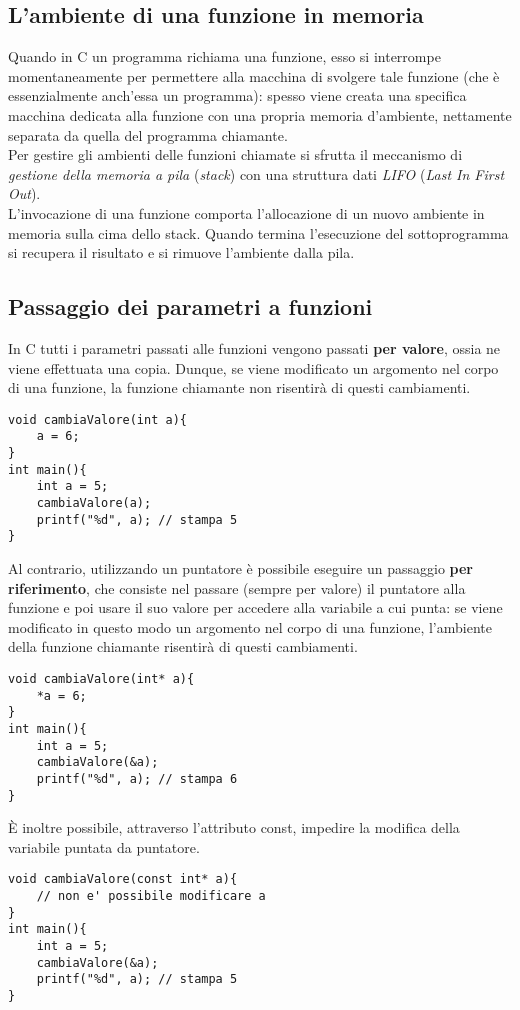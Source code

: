 \subsection{L'ambiente di una funzione in memoria}
Quando in C un programma richiama una funzione, esso si interrompe momentaneamente per permettere alla macchina di svolgere tale funzione (che è essenzialmente anch’essa un programma): spesso viene creata una specifica macchina dedicata alla funzione con una propria memoria d'ambiente, nettamente separata da quella del programma chiamante.\\
Per gestire gli ambienti delle funzioni chiamate si sfrutta il meccanismo di \textit{gestione della memoria a pila} (\textit{stack}) con una struttura dati \textit{LIFO} (\textit{Last In First Out}).\\ L’invocazione di una funzione comporta l’allocazione di un nuovo ambiente in memoria sulla cima dello stack. Quando termina l’esecuzione del sottoprogramma si recupera il risultato e si rimuove l'ambiente dalla pila.

\subsection{Passaggio dei parametri a funzioni}
In C tutti i parametri passati alle funzioni vengono passati \textbf{per valore}, ossia ne viene effettuata una copia. Dunque, se viene modificato un argomento nel corpo di una funzione, la funzione chiamante non risentirà di questi cambiamenti.
\begin{lstlisting}[title={Il passaggio per valore}]
void cambiaValore(int a){
    a = 6;
}
int main(){
    int a = 5;
    cambiaValore(a);
    printf("%d", a); // stampa 5
}
\end{lstlisting}
Al contrario, utilizzando un puntatore è possibile eseguire un passaggio \textbf{per riferimento}, che consiste nel passare (sempre per valore) il puntatore alla funzione e poi usare il suo  valore per accedere alla variabile a cui punta: se viene modificato in questo modo un argomento nel corpo di una funzione, l'ambiente della funzione chiamante risentirà di questi cambiamenti.
\begin{lstlisting}[title={Il passaggio per riferimento}]
void cambiaValore(int* a){
    *a = 6;
}
int main(){
    int a = 5;
    cambiaValore(&a);
    printf("%d", a); // stampa 6
}
\end{lstlisting}

\`{E} inoltre possibile, attraverso l'attributo \colorbox{light-gray}{const}, impedire la modifica della variabile puntata da puntatore.
\begin{lstlisting}[title={Utilizzo dell'attributo const}]
void cambiaValore(const int* a){
    // non e' possibile modificare a
}
int main(){
    int a = 5;
    cambiaValore(&a);
    printf("%d", a); // stampa 5
}
\end{lstlisting}

